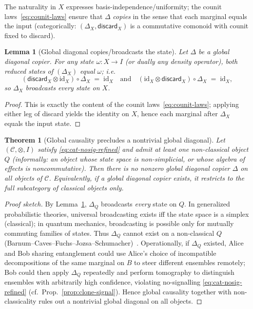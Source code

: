 \documentclass[11pt]{article}
\theoremstyle{upright}
\newtheorem{theorem}{Theorem}
\newtheorem{lemma}{Lemma}
\begin{document}
The naturality in $X$ expresses basis-independence/uniformity; the counit laws~\eqref{eq:counit-laws} ensure that $\Delta$ \emph{copies} in the sense that each marginal equals the input (categorically: $(\Delta_X,\mathsf{discard}_X)$ is a commutative comonoid with counit fixed to discard).

\begin{lemma}[Global diagonal copies/broadcasts the state]
\label{lem:diagonal-broadcasts}
Let $\Delta$ be a global diagonal copier. For any state $\omega:X\to I$ (or dually any density operator), both reduced states of $(\Delta_X)$ equal $\omega$; i.e.
\[
(\mathsf{discard}_X\!\otimes\!\mathrm{id}_X)\circ \Delta_X \;=\;\mathrm{id}_X
\quad\text{and}\quad
(\mathrm{id}_X\!\otimes\!\mathsf{discard}_X)\circ \Delta_X \;=\;\mathrm{id}_X,
\]
so $\Delta_X$ \emph{broadcasts} every state on $X$.
\end{lemma}

\begin{proof}
This is exactly the content of the counit laws~\eqref{eq:counit-laws}; applying either leg of discard yields the identity on $X$, hence each marginal after $\Delta_X$ equals the input state.
\end{proof}

\begin{theorem}[Global causality precludes a nontrivial global diagonal]
\label{thm:causal-nodiagonal-refined}
Let $(\mathcal{C},\otimes,I)$ satisfy \eqref{eq:cat-nosig-refined} and admit at least one \emph{non-classical} object $Q$ (informally: an object whose state space is non-simplicial, or whose algebra of effects is noncommutative). Then there is no nonzero global diagonal copier $\Delta$ on all objects of $\mathcal{C}$. Equivalently, if a global diagonal copier exists, it restricts to the full subcategory of \emph{classical} objects only.
\end{theorem}

\begin{proof}[Proof sketch]
By Lemma~\ref{lem:diagonal-broadcasts}, $\Delta_Q$ broadcasts \emph{every} state on $Q$. In generalized probabilistic theories, universal broadcasting exists iff the state space is a simplex (classical); in quantum mechanics, broadcasting is possible only for mutually commuting families of states. Thus $\Delta_Q$ cannot exist on a non-classical $Q$ (Barnum--Caves--Fuchs--Jozsa--Schumacher)~\cite{BarnumEtAl1996}. Operationally, if $\Delta_Q$ existed, Alice and Bob sharing entanglement could use Alice's choice of incompatible decompositions of the same marginal on $B$ to steer different ensembles remotely; Bob could then apply $\Delta_Q$ repeatedly and perform tomography to distinguish ensembles with arbitrarily high confidence, violating no-signalling \eqref{eq:cat-nosig-refined} (cf.\ Prop.~\ref{prop:clone-signal}). Hence global causality together with non-classicality rules out a nontrivial global diagonal on all objects.
\end{proof}
\end{document}
